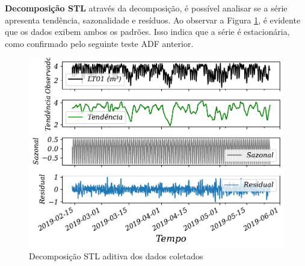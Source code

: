 \textbf{Decomposi\c c\~ao STL}
através da decomposição, é possível analisar se a série apresenta tendência, sazonalidade e resíduos. Ao observar a Figura \ref{fig:stl}, é evidente que os dados exibem ambos os padrões. Isso indica que a série é estacionária, como confirmado pelo seguinte teste ADF anterior.

%	
%	

\begin{figure}[!htb]
	\centering
	\caption{Decomposição STL aditiva dos dados coletados}
	\label{fig:stl}
	\includegraphics[width=0.8\linewidth]{Resultados/Figuras/STL}
		
	
	
\end{figure}






